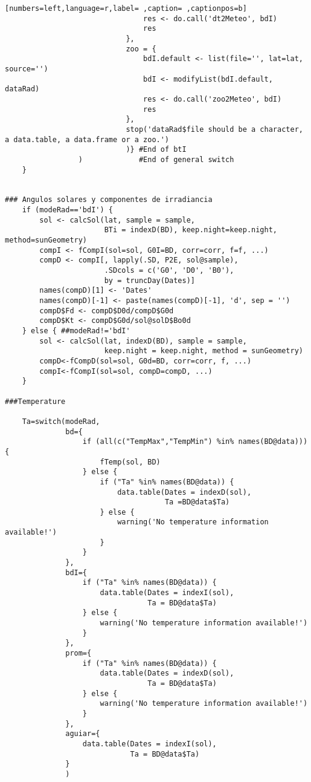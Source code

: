 \begin{lstlisting}[numbers=left,language=r,label= ,caption= ,captionpos=b]
                                res <- do.call('dt2Meteo', bdI)
                                res
                            },
                            zoo = {
                                bdI.default <- list(file='', lat=lat, source='')
                                bdI <- modifyList(bdI.default, dataRad)
                                res <- do.call('zoo2Meteo', bdI)
                                res
                            },
                            stop('dataRad$file should be a character, a data.table, a data.frame or a zoo.')
                            )} #End of btI
                 )             #End of general switch    
    }


### Angulos solares y componentes de irradiancia
    if (modeRad=='bdI') {
        sol <- calcSol(lat, sample = sample,
                       BTi = indexD(BD), keep.night=keep.night, method=sunGeometry)
        compI <- fCompI(sol=sol, G0I=BD, corr=corr, f=f, ...)
        compD <- compI[, lapply(.SD, P2E, sol@sample),
                       .SDcols = c('G0', 'D0', 'B0'),
                       by = truncDay(Dates)]
        names(compD)[1] <- 'Dates'
        names(compD)[-1] <- paste(names(compD)[-1], 'd', sep = '')
        compD$Fd <- compD$D0d/compD$G0d
        compD$Kt <- compD$G0d/sol@solD$Bo0d
    } else { ##modeRad!='bdI'
        sol <- calcSol(lat, indexD(BD), sample = sample,
                       keep.night = keep.night, method = sunGeometry)
        compD<-fCompD(sol=sol, G0d=BD, corr=corr, f, ...)
        compI<-fCompI(sol=sol, compD=compD, ...)
    }

###Temperature

    Ta=switch(modeRad,
              bd={
                  if (all(c("TempMax","TempMin") %in% names(BD@data))) {
                      fTemp(sol, BD)
                  } else {
                      if ("Ta" %in% names(BD@data)) {
                          data.table(Dates = indexD(sol),
                                     Ta =BD@data$Ta)
                      } else {
                          warning('No temperature information available!')
                      }
                  }
              },
              bdI={
                  if ("Ta" %in% names(BD@data)) {
                      data.table(Dates = indexI(sol),
                                 Ta = BD@data$Ta)
                  } else {
                      warning('No temperature information available!')
                  }
              },
              prom={
                  if ("Ta" %in% names(BD@data)) {
                      data.table(Dates = indexD(sol),
                                 Ta = BD@data$Ta)
                  } else {
                      warning('No temperature information available!')
                  }                  
              },
              aguiar={ 
                  data.table(Dates = indexI(sol),
                             Ta = BD@data$Ta)
              }
              )


\end{lstlisting}

